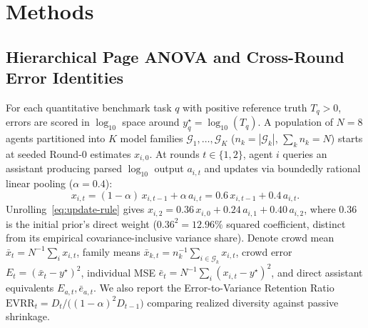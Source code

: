 \documentclass[11pt,letterpaper]{article}
\theoremstyle{plain}
\begin{document}
\section{Methods}

\subsection{Hierarchical Page ANOVA and Cross-Round Error Identities}

For each quantitative benchmark task $q$ with positive reference truth $T_q > 0$, errors are scored in $\log_{10}$ space around $y_q^\star = \log_{10}(T_q)$. A population of $N=8$ agents partitioned into $K$ model families $\mathcal{G}_1,\dots,\mathcal{G}_K$ ($n_k = |\mathcal{G}_k|$, $\sum_k n_k = N$) starts at seeded Round-0 estimates $x_{i,0}$. At rounds $t \in \{1,2\}$, agent $i$ queries an assistant producing parsed $\log_{10}$ output $a_{i,t}$ and updates via boundedly rational linear pooling ($\alpha = 0.4$):
\begin{equation}\label{eq:update-rule}
  x_{i,t} = (1-\alpha)\,x_{i,t-1} + \alpha\,a_{i,t} = 0.6\,x_{i,t-1} + 0.4\,a_{i,t}.
\end{equation}
Unrolling~\eqref{eq:update-rule} gives $x_{i,2} = 0.36\,x_{i,0} + 0.24\,a_{i,1} + 0.40\,a_{i,2}$, where $0.36$ is the initial prior's direct weight ($0.36^2 = 12.96\%$ squared coefficient, distinct from its empirical covariance-inclusive variance share). Denote crowd mean $\bar{x}_t = N^{-1}\sum_i x_{i,t}$, family means $\bar{x}_{k,t} = n_k^{-1}\sum_{i\in \mathcal{G}_k} x_{i,t}$, crowd error $E_t = (\bar{x}_t - y^\star)^2$, individual MSE $\bar{e}_t = N^{-1}\sum_i (x_{i,t}-y^\star)^2$, and direct assistant equivalents $E_{a,t}, \bar{e}_{a,t}$. We also report the Error-to-Variance Retention Ratio $\text{EVRR}_t = D_t / \bigl((1-\alpha)^2 D_{t-1}\bigr)$ comparing realized diversity against passive shrinkage.
\end{document}
